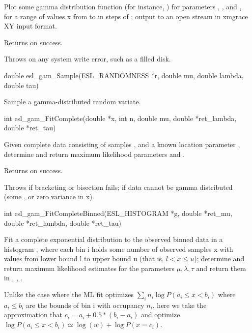 \begin{sreapi}
Plot some gamma distribution function  (for instance,
) for parameters , , and , for
a range of values x from  to  in steps of ;
output to an open stream  in xmgrace XY input format.

Returns  on success.

Throws  on any system write error, such as a filled disk.


\hypertarget{func:esl_gam_Sample()}
{\item[double esl\_gam\_Sample(ESL\_RANDOMNESS *r, double mu, double lambda, double tau)]}

Sample a gamma-distributed random variate.


\hypertarget{func:esl_gam_FitComplete()}
{\item[int esl\_gam\_FitComplete(double *x, int n, double mu, double *ret\_lambda, double *ret\_tau)]}

Given complete data consisting of  samples ,
and a known location parameter , determine and return
maximum likelihood parameters  and .

Returns  on success.

Throws  if bracketing or bisection fails;
 if data cannot be gamma distributed (some ,
or zero variance in x).



\hypertarget{func:esl_gam_FitCompleteBinned()}
{\item[int esl\_gam\_FitCompleteBinned(ESL\_HISTOGRAM *g, double *ret\_mu, double *ret\_lambda, double *ret\_tau)]}

Fit a complete exponential distribution to the observed
binned data in a histogram , where each
bin i holds some number of observed samples x with values from 
lower bound l to upper bound u (that is, $l < x \leq u$);
determine and return maximum likelihood estimates for the
parameters $\mu, \lambda, \tau$ and 
return them in , , .

Unlike the  case where the
ML fit optimizes $\sum_i n_i \log P(a_i \leq x < b_i)$
where $a_i \leq b_i$ are the bounds of bin i with
occupancy $n_i$, here we take the approximation that
$c_i = a_i + 0.5*(b_i-a_i)$ and optimize $\log P(a_i
\leq x < b_i) \simeq \log(w) + \log P(x=c_i)$.


\end{sreapi}
